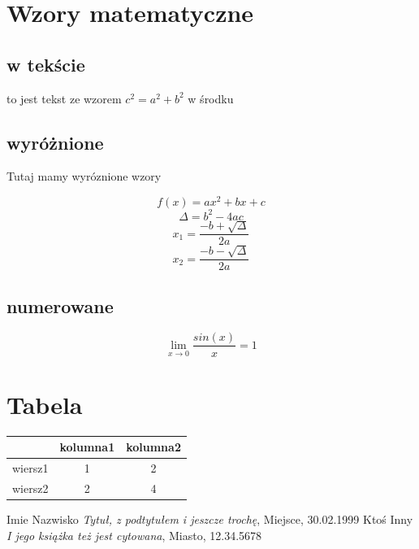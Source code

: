 \documentclass{article}
\theoremstyle{definition}
\begin{document}
\section*{Wzory matematyczne}
\subsection*{w tekście}
to jest tekst ze wzorem $c^2 = a^2 + b^2$ w środku

\subsection*{wyróżnione}
Tutaj mamy wyróznione wzory

\[f(x) = ax^2 + bx + c\]
\[\Delta = b^2 - 4ac\]
\[x_{1} = \frac{-b + \sqrt{\Delta}}{2a}\]
\[x_{2} = \frac{-b - \sqrt{\Delta}}{2a}\]

\subsection*{numerowane}
\begin{equation}
	\lim\limits_{x \to 0}\frac{sin(x)}{x} = 1
\end{equation}

\section*{Tabela}
\begin{table}[h]
\centering
\begin{tabular}{|c|c|c|}
\hline
 & kolumna1 & kolumna2\\
\hline
wiersz1 & 1 & 2\\
\hline
wiersz2 & 2 & 4\\
\hline
\end{tabular}
\end{table}

\begin{thebibliography}{2}
Imie Nazwisko \emph{Tytuł, z podtytułem i jeszcze trochę}, Miejsce, 30.02.1999
Ktoś Inny \emph{I jego książka też jest cytowana}, Miasto, 12.34.5678
\end{thebibliography}
\end{document}
